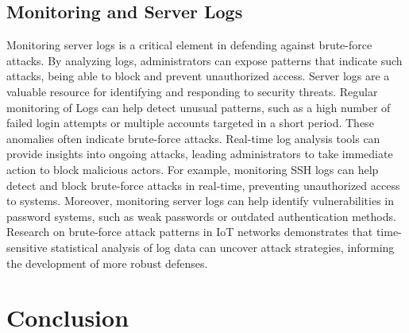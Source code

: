 \documentclass{comjnl}
\begin{document}
\subsection{Monitoring and Server Logs}
Monitoring server logs is a critical element in defending against brute-force attacks. By analyzing logs, administrators can expose patterns that indicate such attacks, being able to block and prevent unauthorized access. Server logs are a valuable resource for identifying and responding to security threats.  Regular monitoring of Logs can help detect unusual patterns, such as a high number of failed login attempts or multiple accounts targeted in a short period. These anomalies often indicate brute-force attacks.  Real-time log analysis tools can provide insights into ongoing attacks, leading administrators to take immediate action to block malicious actors. For example, monitoring SSH logs can help detect and block brute-force attacks in real-time, preventing unauthorized access to systems. \cite{risk_monitoring} Moreover, monitoring server logs can help identify vulnerabilities in password systems, such as weak passwords or outdated authentication methods. Research on brute-force attack patterns in IoT networks demonstrates that time-sensitive statistical analysis of log data can uncover attack strategies, informing the development of more robust defenses.\cite{brute_force_patterns}

\section{Conclusion}
\end{document}
